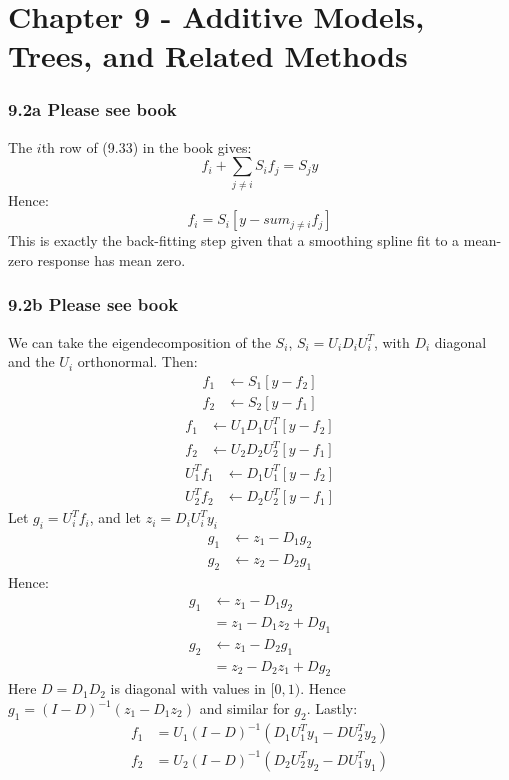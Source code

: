 \chapter{Chapter 9 - Additive Models, Trees, and Related Methods}

\subsection*{9.2a Please see book}

The $i$th row of (9.33) in the book gives:
$$ f_i + \sum_{j \neq i} S_i f_j = S_j y$$
Hence:
$$ f_i = S_i\left[ y - sum_{j \neq i} f_j\right]$$
This is exactly the back-fitting step given that a smoothing spline fit to a mean-zero response has mean zero.

\subsection*{9.2b Please see book}

We can take the eigendecomposition of the $S_i$, $S_i = U_i D_i U_i^T$, with $D_i$ diagonal and the $U_i$ orthonormal.
Then:
\begin{align*}
    f_1 &\leftarrow S_1 \left[y - f_2\right] \\
    f_2 &\leftarrow S_2 \left[y - f_1\right] 
\end{align*}
\begin{align*}
    f_1 &\leftarrow U_1 D_1 U_1^T \left[y - f_2\right] \\
    f_2 &\leftarrow U_2 D_2 U_2^T \left[y - f_1\right]   
\end{align*}
\begin{align*}
    U_1^T f_1 &\leftarrow D_1 U_1^T \left[y - f_2\right] \\
    U_2^T f_2 &\leftarrow D_2 U_2^T \left[y - f_1\right] 
\end{align*}
Let $g_i = U_i^T f_i$, and let $z_i = D_i U_i^T y_i$
\begin{align*}
    g_1 &\leftarrow z_1 - D_1 g_2 \\
    g_2 &\leftarrow z_2 - D_2 g_1
\end{align*}
Hence:
\begin{align*}
    g_1 &\leftarrow z_1 - D_1 g_2 \\
    &= z_1 - D_1 z_2 + D g_1\\
    g_2 &\leftarrow z_1 - D_2 g_1\\
    &= z_2 - D_2 z_1 + D g_2 
\end{align*}
Here $D = D_1 D_2$ is diagonal with values in $[0,1)$. Hence $g_1 = (I - D)^{-1} (z_1 - D_1 z_2)$ and similar for $g_2$.
Lastly:
\begin{align*}
    f_1 &= U_1 (I - D)^{-1} (D_1 U_1^T y_1 - D U_2^T y_2)\\
    f_2 &= U_2 (I - D)^{-1} (D_2 U_2^T y_2 - D U_1^T y_1)
\end{align*}


